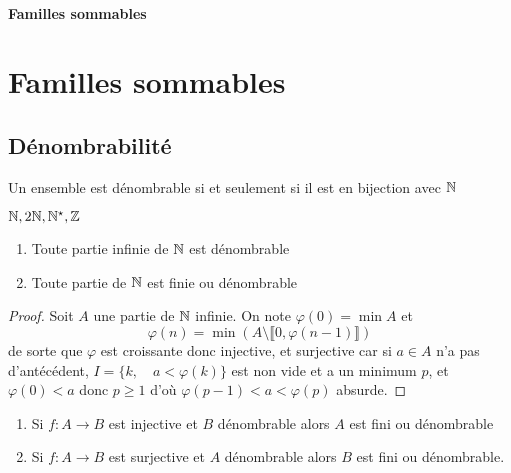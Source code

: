 \ifsolo
    ~

    \vspace{1cm}

    \begin{center}
        \textbf{\LARGE Familles sommables} \\[1em]
    \end{center}
    \tableofcontents
\else
    \chapter{Familles sommables}

    \minitoc
\fi
\thispagestyle{empty}

\ifsolo \newpage \setcounter{page}{1} \fi

\section{Dénombrabilité}

\begin{dfn}
    Un ensemble est dénombrable si et seulement si il est en bijection avec $\mathbb N$
\end{dfn}

\begin{ex}
    $\mathbb N, 2\mathbb N, \mathbb N^\star, \mathbb Z$
\end{ex}

\begin{prop}
    \begin{enumerate}
        \item Toute partie infinie de $\mathbb N$ est dénombrable
        \item Toute partie de $\mathbb N$ est finie ou dénombrable
    \end{enumerate}
\end{prop}

\begin{proof}
    Soit $A$ une partie de $\mathbb N$ infinie. On note $\varphi(0)=\min A$ et \[
        \varphi(n)=\min (A\setminus \llbracket 0, \varphi(n-1)\rrbracket)
    \]
    de sorte que $\varphi$ est croissante donc injective, et surjective car si $a\in A$ n'a pas d'antécédent, $I=\{k, \quad a<\varphi(k)\}$ est non vide et a un minimum $p$, et $\varphi(0)<a$ donc $p\geq 1$ d'où $\varphi(p-1)< a<\varphi(p)$ absurde.
\end{proof}

\begin{prop}
    \begin{enumerate}
        \item Si $f:A\to B$ est injective et $B$ dénombrable alors $A$ est fini ou dénombrable
        \item Si $f:A\to B$ est surjective et $A$ dénombrable alors $B$ est fini ou dénombrable.
    \end{enumerate}
\end{prop}

